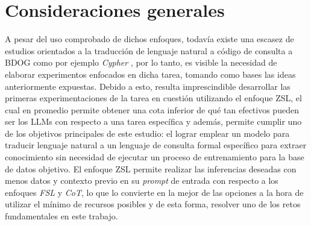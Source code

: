 \section{Consideraciones generales} \label{approaches_conclusions}

A pesar del uso comprobado de dichos enfoques, todavía existe una escasez de estudios orientados a la traducción de lenguaje natural a código de consulta a BDOG como por ejemplo \textit{Cypher} \cite{gpt4graphpaper2023}, por lo tanto, es visible la necesidad de elaborar experimentos enfocados en dicha tarea, tomando como bases las ideas anteriormente expuestas. Debido a esto, resulta imprescindible desarrollar las primeras experimentaciones de la tarea en cuestión utilizando el enfoque ZSL, el cual en promedio permite obtener una cota inferior de qué tan efectivos pueden ser los LLMs con respecto a una tarea específica \cite{llmsoverview} y además, permite cumplir uno de los objetivos principales de este estudio: el lograr emplear un modelo para traducir lenguaje natural a un lenguaje de consulta formal específico para extraer conocimiento sin necesidad de ejecutar un proceso de entrenamiento para la base de datos objetivo. El enfoque ZSL permite realizar las inferencias deseadas con menos datos y contexto previo en su \textit{prompt} de entrada con respecto a los enfoques \textit{FSL} y \textit{CoT}, lo que lo convierte en la mejor de las opciones a la hora de utilizar el mínimo de recursos posibles y de esta forma, resolver uno de los retos fundamentales en este trabajo.


